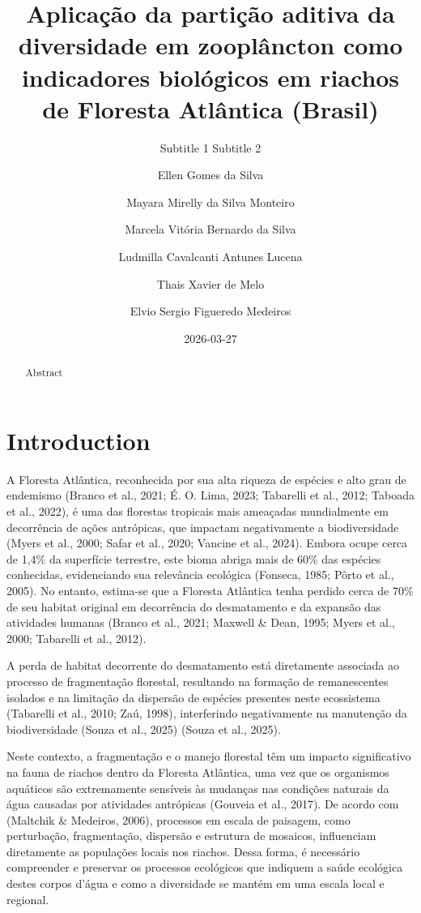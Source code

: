 \documentclass[
  letterpaper,
  DIV=11,
  numbers=noendperiod]{scrartcl}
\title{Aplicação da partição aditiva da diversidade em zooplâncton como
indicadores biológicos em riachos de Floresta Atlântica (Brasil)}
\subtitle{Subtitle 1 Subtitle 2}
\author{Ellen Gomes da Silva \and Mayara Mirelly da Silva
Monteiro \and Marcela Vitória Bernardo da Silva \and Ludmilla Cavalcanti
Antunes Lucena \and Thais Xavier de Melo \and Elvio Sergio Figueredo
Medeiros}
\date{2026-03-27}
\renewcommand*\contentsname{Table of contents}
\newcommand\contentsname{Table of contents}
\begin{document}
\maketitle
\begin{abstract}
Abstract
\end{abstract}

\renewcommand*\contentsname{Table of contents}
{
\hypersetup{linkcolor=}
\setcounter{tocdepth}{3}
\tableofcontents
}
\listoffigures
\listoftables

\section{Introduction}\label{introduction}

A Floresta Atlântica, reconhecida por sua alta riqueza de espécies e
alto grau de endemismo (Branco et al., 2021; É. O. Lima, 2023; Tabarelli
et al., 2012; Taboada et al., 2022), é uma das florestas tropicais mais
ameaçadas mundialmente em decorrência de ações antrópicas, que impactam
negativamente a biodiversidade (Myers et al., 2000; Safar et al., 2020;
Vancine et al., 2024). Embora ocupe cerca de 1,4\% da superfície
terrestre, este bioma abriga mais de 60\% das espécies conhecidas,
evidenciando sua relevância ecológica (Fonseca, 1985; Pôrto et al.,
2005). No entanto, estima-se que a Floresta Atlântica tenha perdido
cerca de 70\% de seu habitat original em decorrência do desmatamento e
da expansão das atividades humanas (Branco et al., 2021; Maxwell \&
Dean, 1995; Myers et al., 2000; Tabarelli et al., 2012).

A perda de habitat decorrente do desmatamento está diretamente associada
ao processo de fragmentação florestal, resultando na formação de
remanescentes isolados e na limitação da dispersão de espécies presentes
neste ecossistema (Tabarelli et al., 2010; Zaú, 1998), interferindo
negativamente na manutenção da biodiversidade (Souza et al., 2025)
(Souza et al., 2025).

Neste contexto, a fragmentação e o manejo florestal têm um impacto
significativo na fauna de riachos dentro da Floresta Atlântica, uma vez
que os organismos aquáticos são extremamente sensíveis às mudanças nas
condições naturais da água causadas por atividades antrópicas (Gouveia
et al., 2017). De acordo com (Maltchik \& Medeiros, 2006), processos em
escala de paisagem, como perturbação, fragmentação, dispersão e
estrutura de mosaicos, influenciam diretamente as populações locais nos
riachos. Dessa forma, é necessário compreender e preservar os processos
ecológicos que indiquem a saúde ecológica destes corpos d'água e como a
diversidade se mantém em uma escala local e regional.
\end{document}
